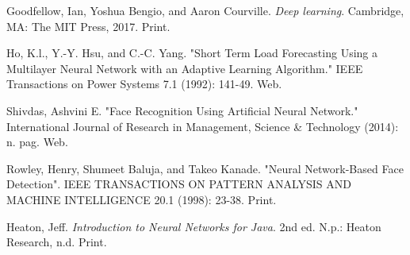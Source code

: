 \documentclass[12pt]{article}
\begin{document}
\begin{thebibliography}{9}
Goodfellow, Ian, Yoshua Bengio, and Aaron Courville. \textit{Deep learning}. Cambridge, MA: The MIT Press, 2017. Print.

Ho, K.l., Y.-Y. Hsu, and C.-C. Yang. "Short Term Load Forecasting Using a Multilayer Neural Network with an Adaptive Learning Algorithm." IEEE Transactions on Power Systems 7.1 (1992): 141-49. Web.

Shivdas, Ashvini E. "Face Recognition Using Artificial Neural Network." International Journal of Research in Management, Science \& Technology (2014): n. pag. Web.

Rowley, Henry, Shumeet Baluja, and Takeo Kanade. "Neural Network-Based Face Detection". IEEE TRANSACTIONS ON PATTERN ANALYSIS AND MACHINE INTELLIGENCE 20.1 (1998): 23-38. Print.

Heaton, Jeff. \textit{Introduction to Neural Networks for Java}. 2nd ed. N.p.: Heaton Research, n.d. Print.
\end{thebibliography}
\end{document}
